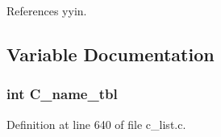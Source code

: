 References yyin.

\subsection{Variable Documentation}
\subsubsection{\setlength{\rightskip}{0pt plus 5cm}int \bf{C\_\-name\_\-tbl}}\label{c__list_8h_446c74d493161a30bddec311a029bed1}




Definition at line 640 of file c\_\-list.c.